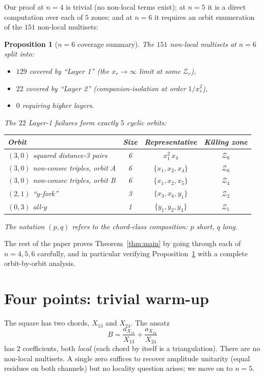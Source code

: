 \documentclass[11pt]{article}
\newcommand{\X}[2]{X_{#1#2}}
\newcommand{\Z}{\mathcal{Z}}
\newtheorem{proposition}{Proposition}
\theoremstyle{definition}
\begin{document}
Our proof at $n=4$ is trivial (no non-local terms exist); at $n=5$ it is
a direct computation over each of $5$ zones; and at $n=6$ it requires an
orbit enumeration of the $151$ non-local multisets:

\begin{proposition}[$n=6$ coverage summary]
\label{prop:n6-summary}
The $151$ non-local multisets at $n=6$ split into:
\begin{itemize}[nosep,leftmargin=2em]
\item $129$ covered by ``Layer 1'' (the $x_r\to\infty$ limit at some $\Z_r$),
\item $22$ covered by ``Layer 2'' (companion-isolation at order $1/x_r^2$),
\item $0$ requiring higher layers.
\end{itemize}
The $22$ Layer-1 failures form exactly $5$ cyclic orbits:
\begin{center}
\begin{tabular}{lccc}
\toprule
Orbit & Size & Representative & Killing zone \\
\midrule
$(3,0)$ squared distance-3 pairs & 6 & $x_1^2\,x_4$ & $\Z_6$\\
$(3,0)$ non-consec triples, orbit A & 6 & $\{x_1, x_2, x_4\}$ & $\Z_6$\\
$(3,0)$ non-consec triples, orbit B & 6 & $\{x_1, x_2, x_5\}$ & $\Z_4$\\
$(2,1)$ ``$y$-fork'' & 3 & $\{x_3, x_6, y_1\}$ & $\Z_2$\\
$(0,3)$ all-$y$ & 1 & $\{y_1, y_2, y_3\}$ & $\Z_1$\\
\bottomrule
\end{tabular}
\end{center}
The notation $(p,q)$ refers to the chord-class composition: $p$ short, $q$
long.
\end{proposition}

The rest of the paper proves Theorem~\ref{thm:main} by going through each
of $n=4, 5, 6$ carefully, and in particular verifying
Proposition~\ref{prop:n6-summary} with a complete orbit-by-orbit analysis.

\section{Four points: trivial warm-up}

The square has two chords, $\X{1}{3}$ and $\X{2}{4}$. The ansatz
\[
B = \frac{a_{\X{1}{3}}}{\X{1}{3}} + \frac{a_{\X{2}{4}}}{\X{2}{4}}
\]
has $2$ coefficients, both \emph{local} (each chord by itself is a
triangulation). There are no non-local multisets. A single zero suffices to
recover amplitude unitarity (equal residues on both channels) but no locality
question arises; we move on to $n=5$.
\end{document}

